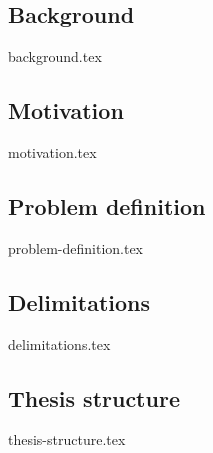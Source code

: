 \subsection{Background}
{background.tex}


\subsection{Motivation}
{motivation.tex}


\subsection{Problem definition}
\label{sec:problemdefinition}
{problem-definition.tex}





\subsection{Delimitations}
{delimitations.tex}


\subsection{Thesis structure}
{thesis-structure.tex}

